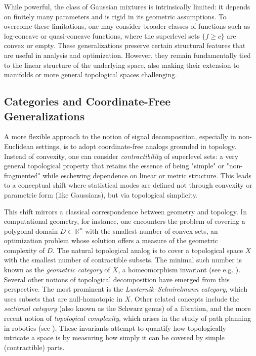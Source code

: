 \documentclass[11pt]{article}
\begin{document}
While powerful, the class of Gaussian mixtures is intrinsically limited: it depends on finitely many parameters and is rigid in its geometric assumptions. To overcome these limitations, one may consider broader classes of functions such as log-concave or quasi-concave functions, where the superlevel sets $\{f \geq c\}$ are convex or empty. These generalizations preserve certain structural features that are useful in analysis and optimization. However, they remain fundamentally tied to the linear structure of the underlying space, also making their extension to manifolds or more general topological spaces challenging.

\subsection{Categories and Coordinate-Free Generalizations}

A more flexible approach to the notion of signal decomposition, especially in non-Euclidean settings, is to adopt coordinate-free analogs grounded in topology. Instead of convexity, one can consider \textit{contractibility} of superlevel sets: a very general topological property that retains the essence of being "simple" or "non-fragmented" while eschewing dependence on linear or metric structure. This leads to a conceptual shift where statistical modes are defined not through convexity or parametric form (like Gaussians), but via topological simplicity.

This shift mirrors a classical correspondence between geometry and topology. In computational geometry, for instance, one encounters the problem of covering a polygonal domain $D \subset \mathbb{R}^n$ with the smallest number of convex sets, an optimization problem whose solution offers a measure of the geometric complexity of $D$. The natural topological analog is to cover a topological space $X$ with the smallest number of contractible subsets. The minimal such number is known as the \emph{geometric category} of $X$, a homeomorphism invariant (see e.g. \cite{james_category_1978}). Several other notions of topological decomposition have emerged from this perspective. The most prominent is the \emph{Lusternik–Schnirelmann category}, which uses subsets that are null-homotopic in $X$. Other related concepts include the \emph{sectional category} (also known as the Schwarz genus) of a fibration, and the more recent notion of \emph{topological complexity}, which arises in the study of path planning in robotics (see \cite{Far03}). These invariants attempt to quantify how topologically intricate a space is by measuring how simply it can be covered by simple (contractible) parts.
\end{document}
